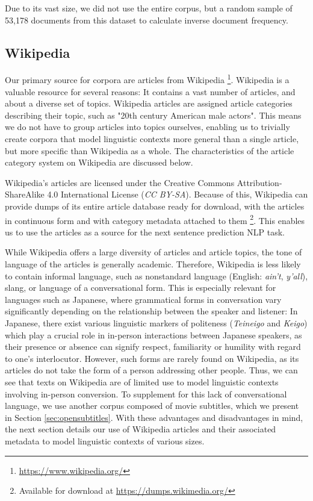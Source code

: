 Due to its vast size, we did not use the entire corpus, but a random sample of 53,178 documents from this dataset to calculate inverse document frequency.

\subsection{Wikipedia} \label{sec:wikipedia}
Our primary source for corpora are articles from Wikipedia \footnote{\url{https://www.wikipedia.org/}}.
Wikipedia is a valuable resource for several reasons:
It contains a vast number of articles, and about a diverse set of topics.
Wikipedia articles are assigned article categories describing their topic, such as "20th century American male actors".
This means we do not have to group articles into topics ourselves, enabling us to trivially create corpora that model linguistic contexts more general than a single article, but more specific than Wikipedia as a whole.
The characteristics of the article category system on Wikipedia are discussed below.

Wikipedia's articles are licensed under the Creative Commons Attribution-ShareAlike 4.0 International License (\textit{CC BY-SA}).
Because of this, Wikipedia can provide dumps of its entire article database ready for download, with the articles in continuous form and with category metadata attached to them \footnote{Available for download at \url{https://dumps.wikimedia.org/}}.
This enables us to use the articles as a source for the next sentence prediction NLP task.

While Wikipedia offers a large diversity of articles and article topics, the tone of language of the articles is generally academic.
Therefore, Wikipedia is less likely to contain informal language, such as nonstandard language (English: \textit{ain't}, \textit{y'all}), slang, or language of a conversational form.
This is especially relevant for languages such as Japanese, where grammatical forms in conversation vary significantly depending on the relationship between the speaker and listener:
In Japanese, there exist various linguistic markers of politeness (\textit{Teineigo} and \textit{Keigo}) which play a crucial role in in-person interactions between Japanese speakers, as their presence or absence can signify respect, familiarity or humility with regard to one's interlocutor.
However, such forms are rarely found on Wikipedia, as its articles do not take the form of a person addressing other people.
Thus, we can see that texts on Wikipedia are of limited use to model linguistic contexts involving in-person conversion.
To supplement for this lack of conversational language, we use another corpus composed of movie subtitles, which we present in Section \ref{sec:opensubtitles}.
With these advantages and disadvantages in mind, the next section details our use of Wikipedia articles and their associated metadata to model linguistic contexts of various sizes.


